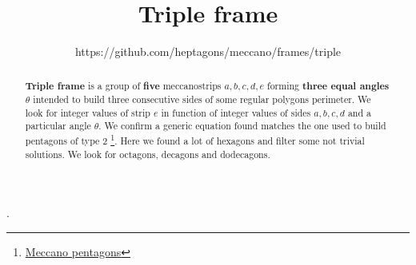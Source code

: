 \documentclass[11pt]{article}
\title{\textbf{Triple frame}}
\author{https://github.com/heptagons/meccano/frames/triple}
\date{}
\begin{document}
\maketitle
\begin{abstract}
\textbf{Triple frame} is a group of \textbf{five} meccano\meccanoref strips $a,b,c,d,e$
forming \textbf{three equal angles} $\theta$ intended to build three consecutive sides
of some regular polygons perimeter.
We look for integer values of strip $e$ in function of integer values of sides $a,b,c,d$ and 
a particular angle $\theta$.
We confirm a generic equation found matches the one used to build pentagons of type 2 \footnote{
\href{https://github.com/heptagons/meccano/blob/main/penta/pentagons.pdf}{Meccano pentagons}}.
Here we found a lot of hexagons and filter some not trivial solutions.
We look for octagons, decagons and dodecagons.
\end{abstract}.
\end{document}
